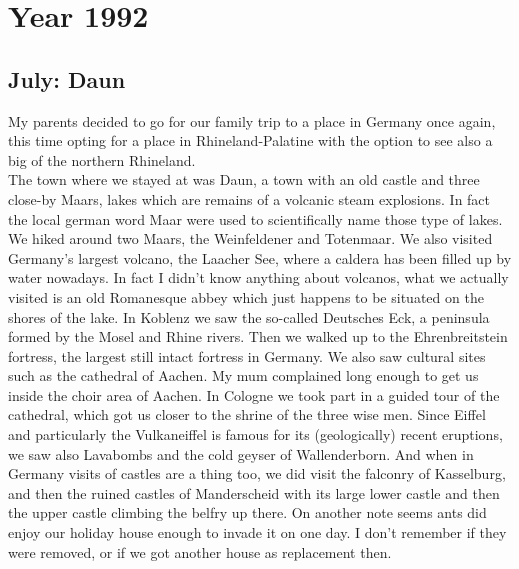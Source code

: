 \chapter{Year 1992}
\label{1992}

\section{July: Daun}
\label{1992:Daun}

My parents decided to go for our family trip to a place in Germany once again, this time opting for a place in Rhineland-Palatine with the option to see also a big of the northern Rhineland. \\ 

The town where we stayed at was Daun, a town with an old castle and three close-by Maars, lakes which are remains of a volcanic steam explosions. In fact the local german word Maar were used to scientifically name those type of lakes. We hiked around two Maars, the Weinfeldener and Totenmaar. We also visited Germany's largest volcano, the Laacher See, where a caldera has been filled up by water nowadays. In fact I didn't know anything about volcanos, what we actually visited is an old Romanesque abbey which just happens to be situated on the shores of the lake. In Koblenz we saw the so-called Deutsches Eck, a peninsula formed by the Mosel and Rhine rivers. Then we walked up to the Ehrenbreitstein fortress, the largest still intact fortress in Germany. We also saw cultural sites such as the cathedral of Aachen. My mum complained long enough to get us inside the choir area of Aachen. In Cologne we took part in a guided tour of the cathedral, which got us closer to the shrine of the three wise men. Since Eiffel and particularly the Vulkaneiffel is famous for its (geologically) recent eruptions, we saw also Lavabombs and the cold geyser of Wallenderborn. And when in Germany visits of castles are a thing too, we did visit the falconry of Kasselburg, and then the ruined castles of Manderscheid with its large lower castle and then the upper castle climbing the belfry up there. On another note seems ants did enjoy our holiday house enough to invade it on one day. I don't remember if they were removed, or if we got another house as replacement then. 






